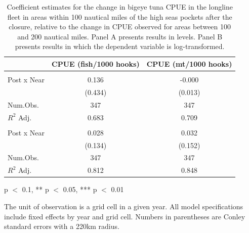 \begin{table}
\centering
\begin{threeparttable}
\small
\caption{\label{tab:h3_reg_bet_ll}Coefficient estimates for the change in bigeye tuna CPUE in the longline fleet in
             areas within 100 nautical miles of the high seas pockets after the closure, relative to the change in CPUE
             observed for areas between 100 and 200 nautical miles.
             Panel A presents results in levels. Panel B presents results in which the dependent variable is log-transformed.}
\centering
\begin{tabular}[t]{lcc}
\toprule
  & CPUE (fish/1000 hooks) & CPUE (mt/1000 hooks)\\
\midrule
\addlinespace[0.5em]
\multicolumn{3}{l}{\textit{A) Levels}}\\
\midrule \hspace{1em}Post x Near & 0.136 & -0.000\\
\hspace{1em} & (0.434) & (0.013)\\
\hspace{1em}Num.Obs. & 347 & \vphantom{1} 347\\
\hspace{1em}$R^2$ Adj. & 0.683 & 0.709\\
\addlinespace[0.5em]
\multicolumn{3}{l}{\textit{B) Log-transformed}}\\
\midrule \hspace{1em}Post x Near & 0.028 & 0.032\\
\hspace{1em} & (0.134) & (0.152)\\
\hspace{1em}Num.Obs. & 347 & 347\\
\hspace{1em}$R^2$ Adj. & 0.812 & 0.848\\
\bottomrule
\end{tabular}
\begin{tablenotes}
\small
\item * p $<$ 0.1, ** p $<$ 0.05, *** p $<$ 0.01
\item The unit of observation is a grid cell in a given year. All model specifications include fixed effects by year and grid cell. Numbers in parentheses are Conley standard errors with a 220km radius.
\end{tablenotes}
\end{threeparttable}
\end{table}
